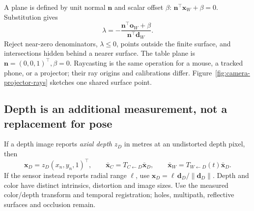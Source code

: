 \documentclass[11pt,a4paper]{article}
\newcommand{\T}[2]{T_{#1\leftarrow #2}}
\newcommand{\pt}[1]{\bm{x}_{#1}}
\newcommand{\hpt}[1]{\bar{\bm{x}}_{#1}}
\begin{document}
A plane is defined by unit normal $\bm{n}$ and scalar offset $\beta$:
$\bm{n}^\top\pt{W}+\beta=0$.
Substitution gives
\begin{equation}
\lambda=-\frac{\bm{n}^\top\bm{o}_W+\beta}
                    {\bm{n}^\top\bm{d}_W}.
\label{eq:intersection}
\end{equation}
Reject near-zero denominators, $\lambda\leq0$, points outside the finite
surface, and intersections hidden behind a nearer surface.
The table plane is $\bm{n}=(0,0,1)^\top,\beta=0$.
Raycasting is the same operation for a mouse, a tracked phone, or a projector;
their ray origins and calibrations differ.
Figure~\ref{fig:camera-projector-rays} sketches one shared surface point.

\begin{center}
\begin{minipage}{\linewidth}
\label{fig:camera-projector-rays}
\end{minipage}
\end{center}

\subsection{Depth is an additional measurement, not a replacement for pose}
If a depth image reports \emph{axial depth} $z_D$ in metres at an undistorted
depth pixel, then
\begin{equation}
\pt{D}=z_D(x_n,y_n,1)^\top,\qquad
\hpt{C}=\T{C}{D}\hpt{D},\qquad
\hpt{W}=\T{W}{D}(t)\hpt{D}.
\end{equation}
If the sensor instead reports radial range $\ell$, use
$\pt{D}=\ell\,\bm{d}_D/\|\bm{d}_D\|$.
Depth and color have distinct intrinsics, distortion and image sizes.
Use the measured color/depth transform and temporal registration;
holes, multipath, reflective surfaces and occlusion remain.
\end{document}
